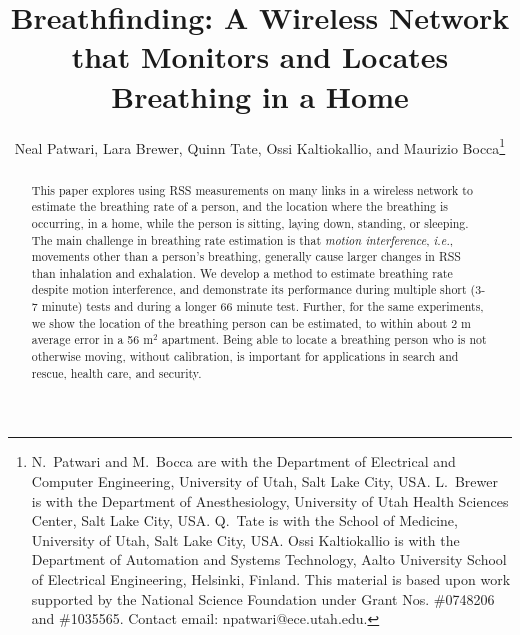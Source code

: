 \documentclass[10pt,journal,letterpaper]{IEEEtran}
\newcommand{\ie}{{\it i.e.}}
\begin{document}
\title{Breathfinding: A Wireless Network that Monitors and Locates Breathing in a Home}


\author{Neal Patwari, Lara Brewer, Quinn Tate, Ossi Kaltiokallio, and Maurizio Bocca\thanks{ N.~Patwari and M.~Bocca are with the Department
of Electrical and Computer Engineering, University of Utah, Salt Lake City, USA.  L.~Brewer is with the Department of Anesthesiology, University of Utah Health Sciences Center, Salt Lake City, USA.  Q.~Tate is with the School of Medicine, University of Utah, Salt Lake City, USA.  Ossi Kaltiokallio is with the Department of Automation and Systems Technology, Aalto University School of Electrical Engineering, 
Helsinki, Finland.  This material is based upon work supported by the National Science Foundation under Grant Nos. \#0748206 and \#1035565.  Contact email: npatwari@ece.utah.edu.}}




\maketitle
\begin{abstract}
This paper explores using RSS measurements on many links in a wireless network to estimate the breathing rate of a person, and the location where the breathing is occurring, in a home, while the person is sitting, laying down, standing, or sleeping.  The main challenge in breathing rate estimation is that \emph{motion interference}, \ie, movements other than a person's breathing, generally cause larger changes in RSS than inhalation and exhalation.  We develop a method to estimate breathing rate despite motion interference, and demonstrate its performance during multiple short (3-7 minute) tests and during a longer 66 minute test.  Further, for the same experiments, we show the location of the breathing person can be estimated, to within about 2 m average error in a 56 m$^2$ apartment. Being able to locate a breathing person who is not otherwise moving, without calibration, is important for applications in search and rescue, health care, and security.
\end{abstract}
\end{document}
